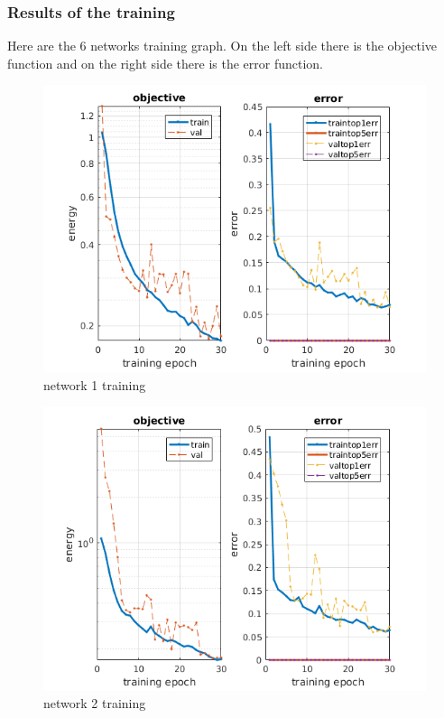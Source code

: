 \documentclass{beamer}
\begin{document}
\begin{frame}

\frametitle{Results of the training}
Here are the 6 networks training graph. On the left side there is the objective function and on the right side there is the error function.

\begin{figure}[h]
	\begin{center}
		\includegraphics[scale=0.5]{init_1.png}
		\caption{network 1 training}
		\label{fig:training1}
	\end{center}
\end{figure}

\end{frame}



\begin{frame}

\begin{figure}[h]
	\begin{center}
		\includegraphics[scale=0.5]{init_2.png}
		\caption{network 2 training}
		\label{fig:training2}
	\end{center}
\end{figure}

\end{frame}
\end{document}
